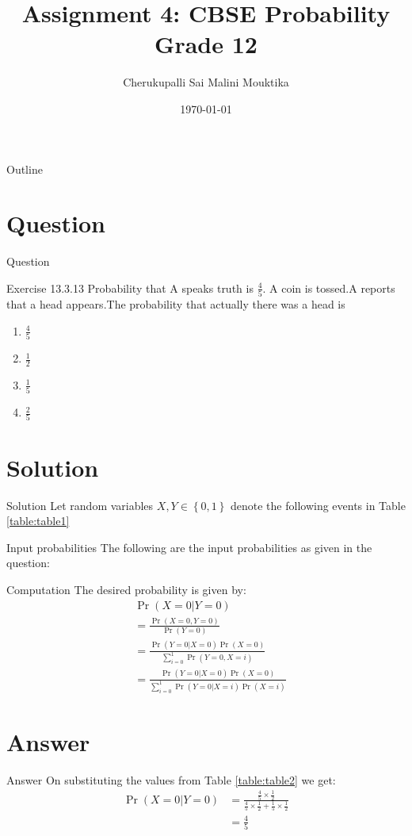 \documentclass{beamer}
\title{Assignment 4: CBSE Probability Grade 12 }
\author{Cherukupalli Sai Malini Mouktika}
\date{\today}
\numberwithin{equation}{subsection}
\providecommand{\pr}[1]{\ensuremath{\Pr\left(#1\right)}}
\providecommand{\cbrak}[1]{\ensuremath{\left\{#1\right\}}}
\begin{document}
\begin{frame}
    \titlepage 
\end{frame}

\logo{}

\begin{frame}{Outline}
    \tableofcontents
\end{frame}

\section{Question}
\begin{frame}{Question}
    \begin{block}{Exercise 13.3.13}
        Probability that A speaks truth is  $\frac45$. A coin is tossed.A reports that a head appears.The probability that actually there was a head is\\
\begin{enumerate}
	\item
	$\frac{4}{5}$
	\item
		$\frac{1}{2}$
     \item
	$\frac{1}{5}$
	\item
		$\frac{2}{5}$
		

\end{enumerate}
    \end{block}
\end{frame}
\section{Solution}
	\begin{frame}{Solution}
	Let random variables $X, Y \in \cbrak{0,1}$ denote the following events in Table \eqref{table:table1}
	\begin{table}[ht!]
		\centering
		
		\caption{Description of events}
		\label{table:table1}	
	\end{table}
	\end{frame}
\begin{frame}{Input probabilities}
The following are the input probabilities as given in the question:
	\begin{table}[ht!]
		\centering
		
		\caption{Input probabilities}
		\label{table:table2}	
	\end{table}
	\end{frame}
\begin{frame}{Computation}
	The desired probability is given by:
	\begin{align}
	&\pr{X = 0|Y = 0} \\ 
		&= \frac{\pr{X = 0,Y = 0}}{\pr{Y = 0}} \\
		&= \frac{\pr{Y = 0|X = 0}\pr{X = 0}}{\sum_{i=0}^1 \pr{Y = 0,X = i}} \\
		&= \frac{\pr{Y = 0|X = 0}\pr{X = 0}}{\sum_{i=0}^1 \pr{Y = 0|X = i}\pr{X = i}}
	\end{align}
	\end{frame}
\section{Answer}
	\begin{frame}{Answer}
	On substituting the values from Table \eqref{table:table2} we get:
\begin{align}
		\pr{X = 0|Y = 0} &= \frac{\frac45 \times \frac12}{\frac45 \times \frac12 +\frac15 \times \frac12} \\
		&= \frac{4}{5} 
	\end{align}
	\end{frame}
\end{document}
